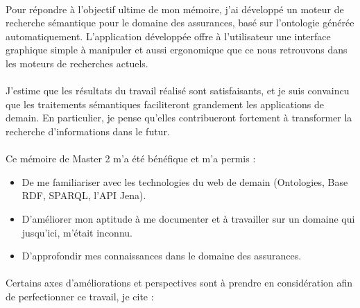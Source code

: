 \documentclass[12pt, a4paper, oneside]{book}
\begin{document}
\paragraph{}

Pour répondre à l'objectif ultime de mon mémoire, j'ai développé un moteur de recherche sémantique pour le domaine des assurances, basé sur l'ontologie générée automatiquement. L'application développée offre à l'utilisateur une interface graphique simple à manipuler et aussi ergonomique que ce nous retrouvons dans les moteurs de recherches actuels.

\paragraph{}

J'estime que les résultats du travail réalisé sont satisfaisants, et je suis convaincu que les  traitements sémantiques faciliteront grandement les applications de demain. En particulier, je pense qu’elles contribueront fortement à transformer la recherche d’informations dans le futur.

\paragraph{} 
Ce mémoire de Master 2 m'a été bénéfique et m'a permis : \\
\begin{itemize}
\item De me familiariser avec les technologies du web de demain (Ontologies, Base RDF, SPARQL,
l’API Jena).\\
\item D'améliorer mon aptitude à me documenter et à travailler sur un domaine qui jusqu’ici,
m'était inconnu.\\
\item D'approfondir mes connaissances dans le domaine des assurances.\\
\end{itemize}

\paragraph{}
Certains axes d'améliorations et perspectives sont à prendre en considération afin de perfectionner ce travail, je cite : \\
\end{document}
